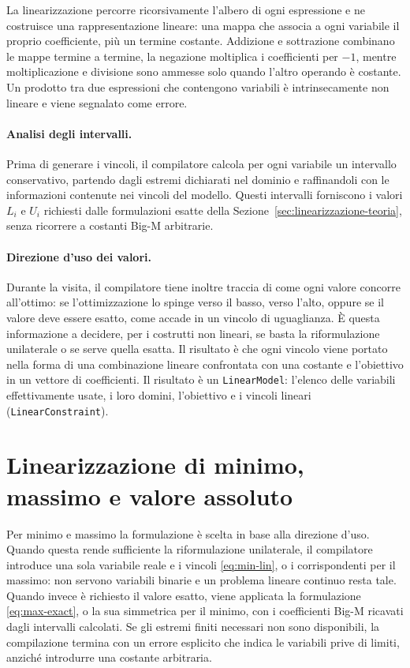 La linearizzazione percorre ricorsivamente l'albero di ogni espressione e ne
costruisce una rappresentazione lineare: una mappa che associa a ogni
variabile il proprio coefficiente, più un termine costante. Addizione e
sottrazione combinano le mappe termine a termine, la negazione moltiplica i
coefficienti per $-1$, mentre moltiplicazione e divisione sono ammesse solo
quando l'altro operando è costante. Un prodotto tra due espressioni che
contengono variabili è intrinsecamente non lineare e viene segnalato come
errore.

\paragraph{Analisi degli intervalli.}
Prima di generare i vincoli, il compilatore calcola per ogni variabile un
intervallo conservativo, partendo dagli estremi dichiarati nel dominio e
raffinandoli con le informazioni contenute nei vincoli del modello. Questi
intervalli forniscono i valori $L_i$ e $U_i$ richiesti dalle formulazioni
esatte della Sezione~\ref{sec:linearizzazione-teoria}, senza ricorrere a
costanti Big-M arbitrarie.

\paragraph{Direzione d'uso dei valori.}
Durante la visita, il compilatore tiene inoltre traccia di come ogni valore
concorre all'ottimo: se l'ottimizzazione lo spinge verso il basso, verso
l'alto, oppure se il valore deve essere esatto, come accade in un vincolo di
uguaglianza. È questa informazione a decidere, per i costrutti non lineari,
se basta la riformulazione unilaterale o se serve quella esatta. 
Il risultato è che ogni vincolo viene portato nella forma di una combinazione lineare confrontata
con una costante e l'obiettivo in un vettore di coefficienti. Il risultato è
un \texttt{LinearModel}: l'elenco delle variabili effettivamente usate, i loro
domini, l'obiettivo e i vincoli lineari (\texttt{LinearConstraint}).


\section{Linearizzazione di minimo, massimo e valore assoluto}
\label{sec:linearizzazione-minmax}

Per minimo e massimo la formulazione è scelta in base alla direzione d'uso.
Quando questa rende sufficiente la riformulazione unilaterale, il compilatore
introduce una sola variabile reale e i vincoli \eqref{eq:min-lin}, o i
corrispondenti per il massimo: non servono variabili binarie e un problema
lineare continuo resta tale. Quando invece è richiesto il valore esatto, viene
applicata la formulazione \eqref{eq:max-exact}, o la sua simmetrica per il
minimo, con i coefficienti Big-M ricavati dagli intervalli calcolati. Se gli
estremi finiti necessari non sono disponibili, la compilazione termina con un
errore esplicito che indica le variabili prive di limiti, anziché introdurre
una costante arbitraria.

